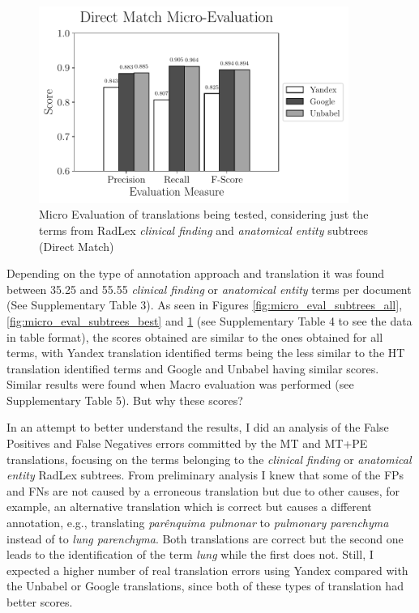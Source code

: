 \begin{figure}
	\centering
	\includegraphics[width=0.9\textwidth]{SupportFiles/plots/direct_match_micro_clinical_anatomical_subtrees_plot.pdf}
	\caption{Micro Evaluation of translations being tested, considering just the terms from RadLex \textit{clinical finding} and \textit{anatomical entity} subtrees (Direct Match)}
	\label{fig:micro_eval_subtrees_direct}
\end{figure}

Depending on the type of annotation approach and translation it was found between 35.25 and 55.55 \textit{clinical finding} or \textit{anatomical entity} terms per document (See Supplementary Table 3). As seen in Figures \ref{fig:micro_eval_subtrees_all}, \ref{fig:micro_eval_subtrees_best} and \ref{fig:micro_eval_subtrees_direct} (see Supplementary Table 4 to see the data in table format), the scores obtained are similar to the ones obtained for all terms, with Yandex translation identified terms being the less similar to the HT translation identified terms and Google and Unbabel having similar scores. Similar results were found when Macro evaluation was performed (see Supplementary Table 5). But why these scores? 

In an attempt to better understand the results, I did an analysis of the False Positives and False Negatives errors committed by the MT and MT+PE translations, focusing on the terms belonging to the \textit{clinical finding} or \textit{anatomical entity} RadLex subtrees. From preliminary analysis I knew that some of the FPs and FNs are not caused by a erroneous translation but due to other causes, for example, an alternative translation which is correct but causes a different annotation, e.g., translating \textit{parênquima pulmonar} to \textit{pulmonary parenchyma} instead of to \textit{lung parenchyma}. Both translations are correct but the second one leads to the identification of the term \textit{lung} while the first does not. Still, I expected a higher number of real translation errors using Yandex compared with the Unbabel or Google translations, since both of these types of translation had better scores.

